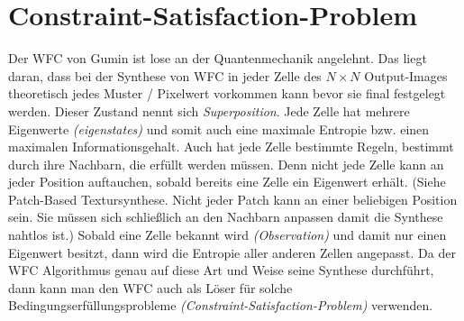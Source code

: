 \documentclass[12pt, a4paper,twoside,openright]{report} %
\begin{document}
\section{Constraint-Satisfaction-Problem}

Der WFC von Gumin ist lose an der Quantenmechanik angelehnt.
Das liegt daran, dass bei der Synthese von WFC in jeder Zelle des $N\times N$ Output-Images theoretisch jedes Muster / Pixelwert vorkommen kann bevor sie final festgelegt werden.
Dieser Zustand nennt sich \textit{Superposition}.
Jede Zelle hat mehrere Eigenwerte \textit{(eigenstates)} und somit auch eine maximale Entropie bzw. einen maximalen Informationsgehalt.
Auch hat jede Zelle bestimmte Regeln, bestimmt durch ihre Nachbarn, die erfüllt werden müssen.
Denn nicht jede Zelle kann an jeder Position auftauchen, sobald bereits eine Zelle ein Eigenwert erhält.
{(Siehe Patch-Based Textursynthese. Nicht jeder Patch kann an einer beliebigen Position sein.
Sie müssen sich schließlich an den Nachbarn anpassen damit die Synthese nahtlos ist.)}
Sobald eine Zelle bekannt wird \textit{(Observation)} und damit nur einen Eigenwert besitzt,
dann wird die Entropie aller anderen Zellen angepasst.
 \cite[S.5, 2.2 The wave function]{Zinkernagel_2016}
Da der WFC Algorithmus genau auf diese Art und Weise seine Synthese durchführt,
dann kann man den WFC auch als Löser für solche Bedingungserfüllungsprobleme \textit{(Constraint-Satisfaction-Problem)} verwenden.
\end{document}
